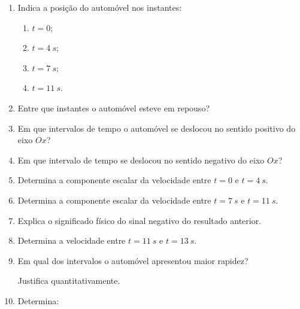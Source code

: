 \documentclass[11pt,a4paper]{article}
\newcommand{\resposta}[1][0.8]{
	\vspace{#1cm}
}
\begin{document}
	\begin{enumerate}[label=\textbf{\arabic*.}]
		
		\item Indica a posição do automóvel nos instantes:
		
		\begin{enumerate}[label=\alph*)]
			\item $t=0$;
			\item $t=\SI{4}{s}$;
			\item $t=\SI{7}{s}$;
			\item $t=\SI{11}{s}$.
		\end{enumerate}
		
		\resposta[0.8]
		
		\item Entre que instantes o automóvel esteve em repouso?
		
		\resposta[0.6]
		
		\item Em que intervalos de tempo o automóvel se deslocou no sentido positivo
		do eixo $Ox$?
		
		\resposta[0.7]
		
		\item Em que intervalo de tempo se deslocou no sentido negativo do eixo
		$Ox$?
		
		\resposta[0.7]
		
		\item Determina a componente escalar da velocidade entre
		$t=0$ e $t=\SI{4}{s}$.
		
		\resposta[1.0]
		
		\item Determina a componente escalar da velocidade entre
		$t=\SI{7}{s}$ e $t=\SI{11}{s}$.
		
		\resposta[1.0]
		
		\item Explica o significado físico do sinal negativo do resultado anterior.
		
		\resposta[1.0]
		
		\item Determina a velocidade entre $t=\SI{11}{s}$ e $t=\SI{13}{s}$.
		
		\resposta[1.0]
		
		\item Em qual dos intervalos o automóvel apresentou maior rapidez?
		
		Justifica quantitativamente.
		
		\resposta[1.2]
		
		\item Determina:
		

\end{enumerate}
\end{document}
